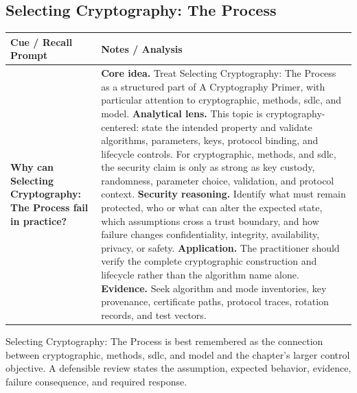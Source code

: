 \documentclass[11pt]{article}
\newcommand{\CornellHeader}{%
\rowcolor{Navy}\color{white}\bfseries Cue / Recall Prompt & \color{white}\bfseries Notes / Analysis\\\hline}
\newcommand{\CornellRow}[2]{%
\cellcolor{CueGray}\RaggedRight\textbf{#1} & \RaggedRight #2\\\hline}
\begin{document}
\subsection*{Selecting Cryptography: The Process}
\begin{longtable}{>{\RaggedRight\arraybackslash}p{}|>{\RaggedRight\arraybackslash}p{}}
\CornellHeader
\CornellRow{Why can Selecting Cryptography: The Process fail in practice?}{\textbf{Core idea.} Treat Selecting Cryptography: The Process as a structured part of A Cryptography Primer, with particular attention to cryptographic, methods, sdlc, and model. \textbf{Analytical lens.} This topic is cryptography-centered: state the intended property and validate algorithms, parameters, keys, protocol binding, and lifecycle controls. For cryptographic, methods, and sdlc, the security claim is only as strong as key custody, randomness, parameter choice, validation, and protocol context. \textbf{Security reasoning.} Identify what must remain protected, who or what can alter the expected state, which assumptions cross a trust boundary, and how failure changes confidentiality, integrity, availability, privacy, or safety. \textbf{Application.} The practitioner should verify the complete cryptographic construction and lifecycle rather than the algorithm name alone. \textbf{Evidence.} Seek algorithm and mode inventories, key provenance, certificate paths, protocol traces, rotation records, and test vectors.}
\end{longtable}
\begin{topicsummary}
Selecting Cryptography: The Process is best remembered as the connection between cryptographic, methods, sdlc, and model and the chapter's larger control objective. A defensible review states the assumption, expected behavior, evidence, failure consequence, and required response.
\end{topicsummary}
\end{document}
